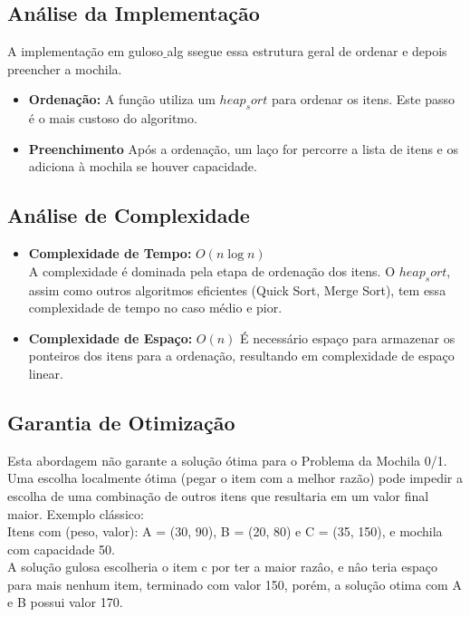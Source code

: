 \documentclass[12pt, a4paper]{article}
\begin{document}
\subsection{Análise da Implementação}

\indent A implementação em guloso$\_$alg ssegue essa estrutura geral de ordenar e depois preencher a mochila.

\begin{itemize}

    \item \textbf{Ordenação:} A função utiliza um $heap_sort$ para ordenar os itens. Este passo é o mais custoso do algoritmo.

    \item \textbf{Preenchimento} Após a ordenação, um laço for percorre a lista de itens e os adiciona à mochila se houver capacidade.

\end{itemize}

\subsection{Análise de Complexidade}

\begin{itemize}

    \item \textbf{Complexidade de Tempo:} $O(n \log n)$\\
    A complexidade é dominada pela etapa de ordenação dos itens. O $heap_sort$, assim como outros algoritmos eficientes (Quick Sort, Merge Sort), tem essa complexidade de tempo no caso médio e pior.

    \item \textbf{Complexidade de Espaço:} $O(n)$
    É necessário espaço para armazenar os ponteiros dos itens para a ordenação, resultando em complexidade de espaço linear.
    
\end{itemize}

\subsection{Garantia de Otimização}

\indent Esta abordagem não garante a solução ótima para o Problema da Mochila 0/1. Uma escolha localmente ótima (pegar o item com a melhor razão) pode impedir a escolha de uma combinação de outros itens que resultaria em um valor final maior. Exemplo clássico:\\

Itens com (peso, valor): A = (30, 90), B = (20, 80) e C = (35, 150), e mochila com capacidade 50.\\

A solução gulosa escolheria o item c por ter a maior razâo, e nâo teria espaço para mais nenhum item, terminado com valor 150, porém, a solução otima com A e B possui valor 170.
\end{document}
